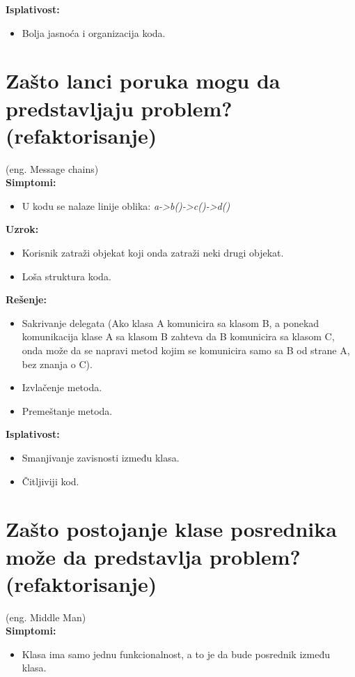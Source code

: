 \documentclass[a4paper]{article}
\begin{document}
  \noindent \textbf{Isplativost:} 
  \begin{itemize}
    \item Bolja jasnoća i organizacija koda.
  \end{itemize}

\section{Zašto lanci poruka mogu da predstavljaju problem? (refaktorisanje)}
  (eng. Message chains)\\
  \textbf{Simptomi:}
  \begin{itemize}
    \item U kodu se nalaze linije oblika: \textit{a->b()->c()->d()}
  \end{itemize}

  \noindent \textbf{Uzrok:} 
  \begin{itemize}
    \item Korisnik zatraži objekat koji onda zatraži neki drugi objekat.
    \item Loša struktura koda.
  \end{itemize}

  \noindent \textbf{Rešenje:} 
  \begin{itemize}
    \item Sakrivanje delegata (Ako klasa A komunicira sa klasom B, a ponekad komunikacija
          klase A sa klasom B zahteva da B komunicira sa klasom C, onda može 
          da se napravi metod kojim se komunicira samo sa B od strane A, bez znanja o C).
    \item Izvlačenje metoda.
    \item Premeštanje metoda.
  \end{itemize}

  \noindent \textbf{Isplativost:} 
  \begin{itemize}
    \item Smanjivanje zavisnosti između klasa.
    \item Čitljiviji kod.
  \end{itemize}

\section{Zašto postojanje klase posrednika može da predstavlja problem? (refaktorisanje)}
  (eng. Middle Man)\\
  \textbf{Simptomi:}
  \begin{itemize}
    \item Klasa ima samo jednu funkcionalnost, a to je da bude posrednik između klasa.
  \end{itemize}
\end{document}
